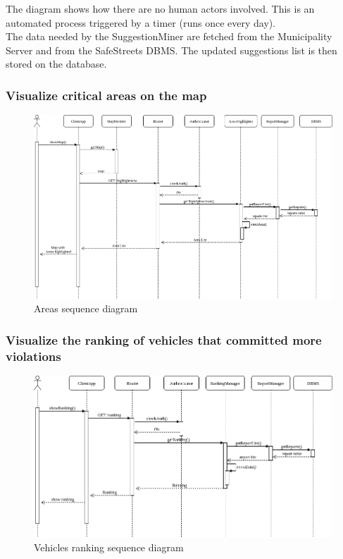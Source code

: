 \documentclass{article}
\begin{document}
The diagram shows how there are no human actors involved. This is an automated process triggered by a timer (runs once every day). \\
The data needed by the SuggestionMiner are fetched from the Municipality Server and from the SafeStreets DBMS. The updated suggestions list is then stored on the database.
\newpage
\subsubsection{Visualize critical areas on the map}
\begin{figure}[!htb]
\centering
	\includegraphics[width=1.0\textwidth]{images/area-highlight-sequence.png}
	\caption{Areas sequence diagram}
	\label{fig:area-highlight-sequence}
\end{figure}

\newpage
\subsubsection{Visualize the ranking of vehicles that committed more violations}
\begin{figure}[!htb]
\centering
	\includegraphics[width=1.0\textwidth]{images/ranking-sequence.png}
	\caption{Vehicles ranking sequence diagram}
	\label{fig:ranking-sequence}
\end{figure}
\end{document}
